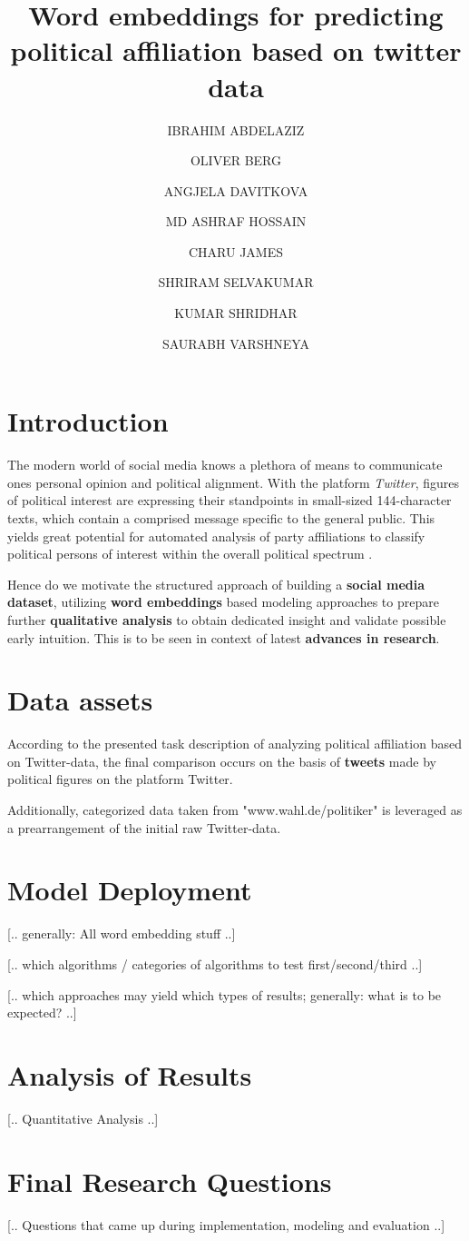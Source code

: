 \documentclass[10pt, oneside]{article}
\title{Word embeddings for predicting political affiliation based on twitter data}
\author[]{IBRAHIM ABDELAZIZ}
\author[]{OLIVER BERG}
\author[]{ANGJELA DAVITKOVA}
\author[]{MD ASHRAF HOSSAIN}
\author[]{CHARU JAMES}
\author[]{SHRIRAM SELVAKUMAR}
\author[]{KUMAR SHRIDHAR}
\author[]{SAURABH VARSHNEYA}
\affil[1]{Technische Universität Kaiserslautern}
\begin{document}
\maketitle
\begin{multicols}{2}


\section{Introduction}

The modern world of social media knows a plethora of means to communicate ones personal opinion and political alignment. With the platform \textit{Twitter}, figures of political interest are expressing their standpoints in small-sized 144-character texts, which contain a comprised message specific to the general public. This yields great potential for automated analysis of party affiliations to classify political persons of interest within the overall political spectrum \cite{Biessmann2017}.

Hence do we motivate the structured approach of building a \textbf{social media dataset}, utilizing \textbf{word embeddings} \cite{Pelevinala2016} based modeling approaches to prepare further \textbf{qualitative analysis} to obtain dedicated insight and validate possible early intuition.
This is to be seen in context of latest \textbf{advances in research}.


\section{Data assets}

According to the presented task description of analyzing political affiliation based on Twitter-data, the final comparison occurs on the basis of \textbf{tweets} made by political figures on the platform Twitter.

Additionally, categorized data taken from "www.wahl.de/politiker" is leveraged as a prearrangement of the initial raw Twitter-data.


\section{Model Deployment}

[.. generally: All word embedding stuff ..]

[.. which algorithms / categories of algorithms to test first/second/third ..]

[.. which approaches may yield which types of results; generally: what is to be expected? ..]


\section{Analysis of Results}

[.. Quantitative Analysis ..]


\section{Final Research Questions}

[.. Questions that came up during implementation, modeling and evaluation ..]




\end{multicols}
\end{document}
